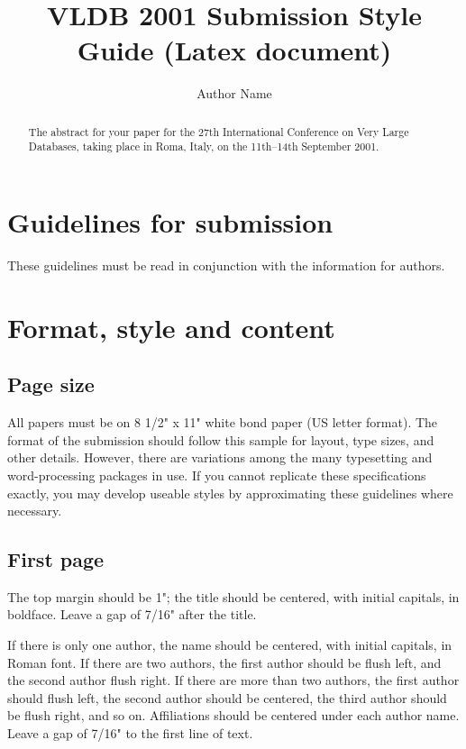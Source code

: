 \documentclass{vldb}
\title{VLDB 2001 Submission Style Guide (Latex document)}
\author{Author Name}
\begin{document}
\maketitle

\begin{abstract}
The abstract for your paper for the 27th International Conference on
Very Large Databases, taking place in Roma, Italy, on the 11th--14th
September 2001.
\end{abstract}


\section{Guidelines for submission}

These guidelines must be read in conjunction with the information for
authors.

\section{Format, style and content}

\subsection{Page size}

All papers must be on 8 1/2" x 11" white bond paper (US letter
format).  The format of the submission should follow this sample for
layout, type sizes, and other details.  However, there are variations
among the many typesetting and word-processing packages in use.  If
you cannot replicate these specifications exactly, you may develop
useable styles by approximating these guidelines where necessary.


\subsection{First page}

The top margin should be 1"; the title should be centered, with
initial capitals, in boldface. Leave a gap of 7/16" after the title.

If there is only one author, the name should be centered, with initial
capitals, in Roman font. If there are two authors, the first author
should be flush left, and the second author flush right.  If there are
more than two authors, the first author should flush left, the second
author should be centered, the third author should be flush right, and
so on.  Affiliations should be centered under each author name. Leave
a gap of 7/16" to the first line of text.
\end{document}
